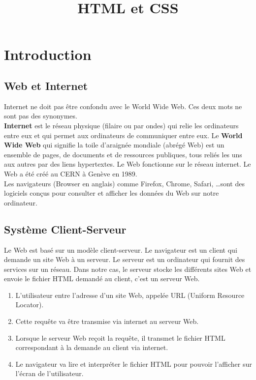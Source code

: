 \documentclass[a4paper,11pt]{article}
\begin{document}
\title{HTML et CSS}
\date{}
\maketitle

\section{Introduction}
\subsection{Web et Internet}
Internet ne doit pas être confondu avec le World Wide Web. Ces deux mots ne sont pas des synonymes.\\
\textbf{Internet} est le réseau physique (filaire ou par ondes) qui relie les ordinateurs entre eux et qui permet aux ordinateurs de communiquer entre eux.
Le \textbf{World Wide Web} qui signifie la toile d'araignée mondiale (abrégé Web) est un ensemble de pages, de documents et de ressources publiques, tous reliés les uns aux autres par des liens hypertextes. Le Web fonctionne sur le réseau internet. Le Web a été créé au CERN à Genève en 1989.\\
Les navigateurs (Browser en anglais) comme Firefox, Chrome, Safari, \dots sont des logiciels conçus pour consulter et afficher les données du Web sur notre ordinateur.

\subsection{Système Client-Serveur}
Le Web est basé sur un modèle client-serveur. Le navigateur est un client qui demande un site Web à un serveur. Le serveur est un ordinateur qui fournit des services sur un réseau. Dans notre cas, le serveur stocke les différents sites Web et envoie le fichier HTML demandé au client, c'est un serveur Web.
\begin{enumerate}[label=\arabic*)]
\item L'utilisateur entre l'adresse d'un site Web, appelée URL (Uniform Resource Locator).
\item Cette requête va être transmise via internet au serveur Web.
\item Lorsque le serveur Web reçoit la requête, il transmet le fichier HTML correspondant à la demande au client via internet.
\item Le navigateur va lire et interpréter le fichier HTML pour pouvoir l'afficher sur l'écran de l'utilisateur.
\end{enumerate}
\end{document}
